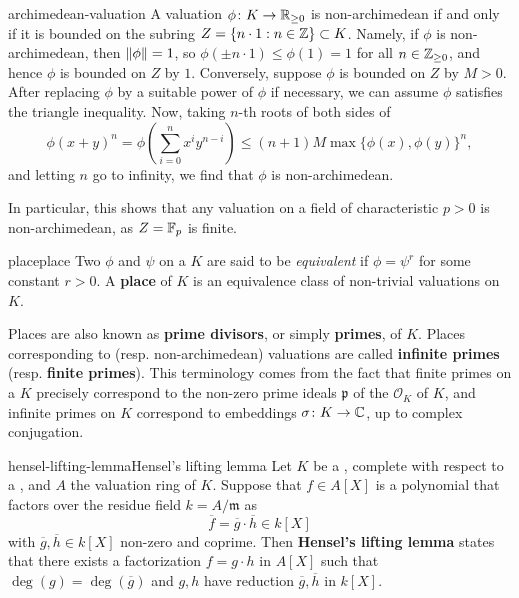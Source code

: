\begin{example}{archimedean-valuation}
    A valuation $\phi \colon K \to \mathbb{R}_{\ge 0}$ is non-archimedean if and only if it is bounded on the subring $Z = \{ n \cdot 1 : n \in \mathbb{Z} \} \subset K$. Namely, if $\phi$ is non-archimedean, then $\left\|\phi\right\| = 1$, so $\phi(\pm n \cdot 1) \le \phi(1) = 1$ for all $n \in \mathbb{Z}_{\ge 0}$, and hence $\phi$ is bounded on $Z$ by $1$. Conversely, suppose $\phi$ is bounded on $Z$ by $M > 0$. After replacing $\phi$ by a suitable power of $\phi$ if necessary, we can assume $\phi$ satisfies the triangle inequality. Now, taking $n$-th roots of both sides of
    \[ \phi(x + y)^n = \phi \left( \sum_{i = 0}^{n} x^i y^{n - i} \right) \le (n + 1) M \max \{ \phi(x), \phi(y) \}^n , \]
    and letting $n$ go to infinity, we find that $\phi$ is non-archimedean.
    
    In particular, this shows that any valuation on a field of characteristic $p > 0$ is non-archimedean, as $Z = \mathbb{F}_p$ is finite.
\end{example}

\begin{topic}{place}{place}
    Two  $\phi$ and $\psi$ on a  $K$ are said to be \textit{equivalent} if $\phi = \psi^r$ for some constant $r > 0$. A \textbf{place} of $K$ is an equivalence class of non-trivial valuations on $K$.
    
    Places are also known as \textbf{prime divisors}, or simply \textbf{primes}, of $K$. Places corresponding to  (resp. non-archimedean) valuations are called \textbf{infinite primes} (resp. \textbf{finite primes}). This terminology comes from the fact that finite primes on a  $K$ precisely correspond to the non-zero prime ideals $\mathfrak{p}$ of the  $\mathcal{O}_K$ of $K$, and infinite primes on $K$ correspond to embeddings $\sigma \colon K \to \mathbb{C}$, up to complex conjugation.
\end{topic}

    

\begin{topic}{hensel-lifting-lemma}{Hensel's lifting lemma}
    Let $K$ be a , complete with respect to a  , and $A$ the valuation ring of $K$.
    Suppose that $f \in A[X]$ is a polynomial that factors over the residue field $k = A / \mathfrak{m}$ as
    \[ \overline{f} = \overline{g} \cdot \overline{h} \in k[X] \]
    with $\overline{g}, \overline{h} \in k[X]$ non-zero and coprime. Then \textbf{Hensel's lifting lemma} states that there exists a factorization $f = g \cdot h$ in $A[X]$ such that $\deg(g) = \deg(\overline{g})$ and $g, h$ have reduction $\overline{g}, \overline{h}$ in $k[X]$.
\end{topic}

